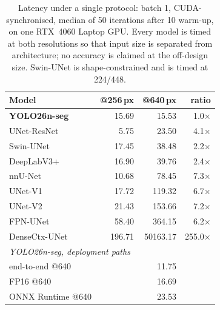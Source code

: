 \begin{table}[t]
\centering
\caption{Latency under a single protocol: batch 1, CUDA-synchronised, median of 50 iterations after 10 warm-up, on one RTX~4060 Laptop GPU. Every model is timed at both resolutions so that input size is separated from architecture; no accuracy is claimed at the off-design size. Swin-UNet is shape-constrained and is timed at 224/448.}
\label{tab:latency}
\small
\begin{tabular}{lrrr}
\toprule
Model & @256\,px & @640\,px & ratio \\
\midrule
\textbf{YOLO26n-seg} & 15.69 & 15.53 & 1.0$\times$ \\
UNet-ResNet & 5.75 & 23.50 & 4.1$\times$ \\
Swin-UNet & 17.45 & 38.48 & 2.2$\times$ \\
DeepLabV3+ & 16.90 & 39.76 & 2.4$\times$ \\
nnU-Net & 10.68 & 78.45 & 7.3$\times$ \\
UNet-V1 & 17.72 & 119.32 & 6.7$\times$ \\
UNet-V2 & 21.43 & 153.66 & 7.2$\times$ \\
FPN-UNet & 58.40 & 364.15 & 6.2$\times$ \\
DenseCtx-UNet & 196.71 & 50163.17 & 255.0$\times$ \\
\midrule
\multicolumn{4}{l}{\textit{YOLO26n-seg, deployment paths}} \\
\quad end-to-end @640 & & 11.75 & \\
\quad FP16 @640 & & 16.69 & \\
\quad ONNX Runtime @640 & & 23.53 & \\
\bottomrule
\end{tabular}
\end{table}
